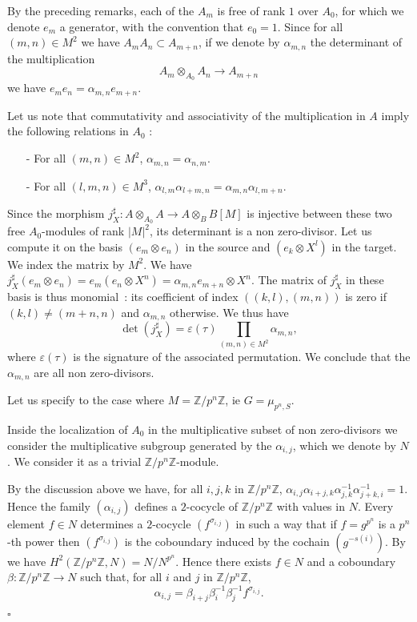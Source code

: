 \documentclass{amsart}
\newenvironment{demo}{{\flushleft \bf Proof~:}}{\hfill $\square$ \vspace{5mm}}
\theoremstyle{definition}
\theoremstyle{remark}
\begin{document}
\begin{demo}

By the preceding remarks, each of the $A_m$ is free of rank $1$ over $A_0$, for which we denote $e_m$ a generator, with the convention that $e_0=1$. Since for all $(m,n) \in M^2$ we have $A_mA_n \subset A_{m+n}$, if we denote by $\alpha_{m,n}$ the determinant of the multiplication \[ A_m \otimes_{A_0} A_n {\longrightarrow} A_{m+n} \] we have $e_me_n = \alpha_{m,n} e_{m+n}$.

Let us note that commutativity and associativity of the multiplication in $A$ imply the following relations in $A_0$ : 

\begin{itemize}

\item[-] For all $(m,n) \in M^2$, $\alpha_{m,n} = \alpha_{n,m}$.
\item[-] For all $(l,m,n) \in M^3$, $\alpha_{l,m} \alpha_{l+m,n} = \alpha_{m,n}\alpha_{l,m+n}$.

\end{itemize}

Since the morphism $j_X^\sharp : A \otimes_{A_0} A {\longrightarrow} A \otimes_B B[M]$ is injective between these two free $A_0$-modules of rank $\vert M \vert^2$, its determinant is a non zero-divisor. Let us compute it on the basis $(e_m \otimes e_n)$ in the source and $(e_k \otimes X^l)$ in the target. We index the matrix by $M^2$.  
We have $j_X^\sharp(e_m \otimes e_n) = e_m(e_n \otimes X^n) = \alpha_{m,n}e_{m+n} \otimes X^n$. The matrix of $j_X^\sharp$ in these basis is thus monomial~: its coefficient of index $((k,l),(m,n))$ is zero if $(k,l) \neq (m+n,n)$ and $\alpha_{m,n}$ otherwise. We thus have \[ \det(j_X^\sharp)= \varepsilon(\tau) \displaystyle\prod_{(m,n) \in M^2} \alpha_{m,n}, \] where $\varepsilon(\tau)$ is the signature of the associated permutation. We conclude that the $\alpha_{m,n}$ are all non zero-divisors.  \label{nzero}  

Let us specify to the case where $M = {\mathbb{Z}} / p^n {\mathbb{Z}}$, ie $G = \mu_{p^n,S}$.

Inside the localization of $A_0$ in the multiplicative subset of non zero-divisors we consider the multiplicative subgroup generated by the $\alpha_{i,j}$, which we denote by $N$. We consider it as a trivial ${\mathbb{Z}} / p^n {\mathbb{Z}}$-module.

By the discussion above we have, for all $i,j,k$ in ${\mathbb{Z}} / p^n {\mathbb{Z}}$, $\alpha_{i,j} \alpha_{i+j,k}\alpha_{j,k}^{-1} \alpha_{j+k,i}^{-1} = 1$. Hence the family $(\alpha_{i,j})$ defines a $2$-cocycle of ${\mathbb{Z}} / p^n {\mathbb{Z}}$ with values in $N$.
Every element $f \in N$ determines a $2$-cocycle $(f^{\sigma_{i,j}})$ in such a way that if $f=g^{p^n}$ is a $p^n$-th power then $(f^{\sigma_{i,j}})$ is the coboundary induced by the cochain $(g^{-s(i)})$. By \cite[VIII, \S 4]{Se} we have $H^2({\mathbb{Z}}/ p^n {\mathbb{Z}},N) = N/N^{p^n}$. Hence there exists $f \in N$ and a coboundary $\beta : {\mathbb{Z}}/ p^n {\mathbb{Z}} {\longrightarrow} N$ such that, for all $i$ and $j$ in ${\mathbb{Z}} / p^n {\mathbb{Z}}$, \[ \alpha_{i,j}=\beta_{i+j} \beta_i^{-1}\beta_j^{-1} f^{\sigma_{i,j}}. \]


\end{demo}
\end{document}
